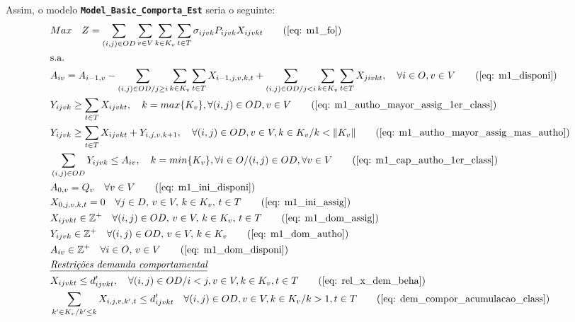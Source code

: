Assim, o modelo \textbf{ \texttt{Model\_Basic\_Comporta\_Est}} seria o seguinte:
\allowdisplaybreaks
\begin{align}
	& Max \quad Z = \sum_{(i,j)\in OD} \sum_{v\in V} \sum_{k\in K_v} \sum_{t\in T} \sigma_{ijvk} P_{ijvk} X_{ijvkt}     \tag{\ref{eq: m1_fo}}   \\
	& \text{s.a.}  \notag \\
	& A_{iv} = A_{i-1,v} - \sum_{(i,j) \in OD/j \geq i} \sum_{k\in K_v}\sum_{t\in T}X_{i-1,j,v,k,t} + \sum_{(i,j) \in OD/j<i} \sum_{k\in K_v}\sum_{t\in T}X_{jivkt}, \quad \forall i \in O, v \in V   \tag{\ref{eq: m1_disponi}} \\
	& Y_{ijvk} \geq  \sum_{t \in T} X_{ijvkt},  \quad k = max\{K_v\}, \forall(i,j) \in OD ,v \in V     \tag{\ref{eq: m1_autho_mayor_assig_1er_class}} \\
	& Y_{ijvk} \geq  \sum_{t \in T} X_{ijvkt} + Y_{i,j,v,k + 1} , \quad \forall(i,j) \in OD, v \in V, k \in K_v / k < \lVert K_v \rVert   \tag{\ref{eq: m1_autho_mayor_assig_mas_autho}} \\
	& \sum_{(i,j) \in OD} Y_{ijvk} \leq A_{iv}, \quad  k = min\{K_v\}, \forall i \in O / (i,j) \in OD,   \forall v \in V       \tag{\ref{eq: m1_cap_autho_1er_class}} \\
	& A_{0,v} = Q_v \quad \forall v \in V  \tag{\ref{eq: m1_ini_disponi}} \\ 
	& X_{0,j,v,k,t} = 0 \quad \forall j \in D,\, v \in V,\, k \in K_v,\, t \in T  \tag{\ref{eq: m1_ini_assig}} \\ 
	& X_{ijvkt} \in \mathbb{Z}^+ \quad \forall(i,j) \in OD,\, v \in V,\, k \in K_v,\, t \in T  \tag{\ref{eq: m1_dom_assig}} \\ 
	& Y_{ijvk} \in \mathbb{Z}^+ \quad \forall(i,j) \in OD,\, v \in V,\, k \in K_v  \tag{\ref{eq: m1_dom_autho}} \\ 
	& A_{iv} \in \mathbb{Z}^+ \quad \forall i \in O,\, v \in V  \tag{\ref{eq: m1_dom_disponi}} \\
	& \textit{\underline{Restrições demanda comportamental}}         \notag   \\
	& X_{ijvkt} \leq d'_{ijvkt},  \quad \forall (i,j) \in OD / i < j  ,v \in V, k \in K_v, t\in T   \tag{\ref{eq: rel_x_dem_beha}} \\
	& \sum_{k' \in K_v / k' \leq k}X_{i,j,v,k',t} \leq d'_{ijvkt} \quad \forall (i,j) \in OD, v \in V, k \in K_v / k > 1, t\in T     \tag{\ref{eq: dem_compor_acumulacao_class}} \\

\end{align}
